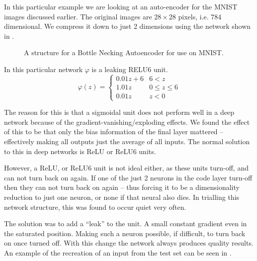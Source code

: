 \documentclass[12pt,parskip]{komatufte}
\begin{document}
In this particular example we are looking at an auto-encoder for the MNIST images discussed earlier.
The original images are $28 \times 28$ pixels, i.e. 784 dimensional.
We compress it down to just 2 dimensions using the network shown in .

\begin{figure}
	\caption{A structure for a Bottle Necking Autoencoder for use on MNIST.}
	\label{fig-autoencoder}
	
\end{figure}


In this particular network $\varphi$ is a leaking RELU6 unit.
\begin{equation}
\varphi(z)=\begin{cases}
    0.01z+6 & 6<z \\
	1.01z & 0 \le z \le 6 \\
	0.01z & z < 0
\end{cases}
\end{equation}

The reason for this is that a sigmoidal unit does not perform well in a deep network because of the gradient-vanishing/exploding effects.
We found the effect of this to be that only the bias information of the final layer mattered -- effectively making all outputs just the average of all inputs.
The normal solution to this in deep networks is ReLU or ReLU6 units.

However, a ReLU, or ReLU6 unit is not ideal either,
as these units turn-off, and can not turn back on again.
If one of the just 2 neurons in the code layer turn-off then they can not turn back on again -- thus forcing it to be a dimensionality reduction to just one neuron, or none if that neural also dies.
In trialling this network structure, this was found to occur quiet very often.

The solution was to add a ``leak'' to the unit.
A small constant gradient even in the saturated position.
Making such a neuron possible, if difficult, to turn back on once turned off.
With this change the network always produces quality results.
An example of the recreation of an input from the test set can be seen in 
 . 
\end{document}
